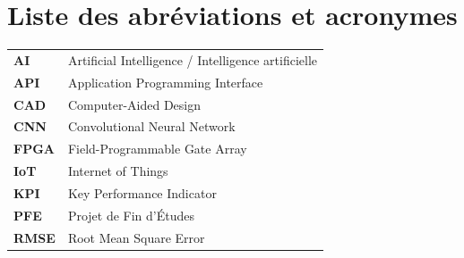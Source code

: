\chapter*{Liste des abr\'eviations et acronymes}
\begin{longtable}{p{3cm}p{11cm}}
\textbf{AI} & Artificial Intelligence / Intelligence artificielle \\
\textbf{API} & Application Programming Interface \\
\textbf{CAD} & Computer-Aided Design \\
\textbf{CNN} & Convolutional Neural Network \\
\textbf{FPGA} & Field-Programmable Gate Array \\
\textbf{IoT} & Internet of Things \\
\textbf{KPI} & Key Performance Indicator \\
\textbf{PFE} & Projet de Fin d'\'Etudes \\
\textbf{RMSE} & Root Mean Square Error \\
\end{longtable}
